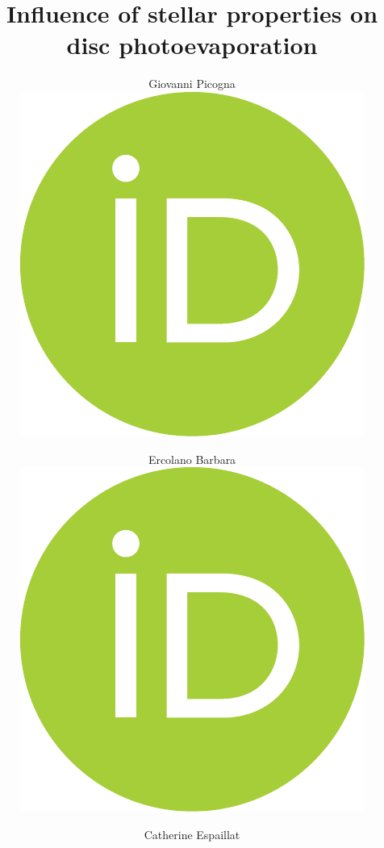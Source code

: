 \documentclass{aa}
\begin{document}
    \title{Influence of stellar properties on disc photoevaporation}

    \author{
        Giovanni Picogna  \href{https://orcid.org/0000-0003-3754-1639}{\includegraphics[scale=0.04]{orcid}} \and
        Ercolano Barbara 
        \href{https://orcid.org/0000-0001-7868-2740}{\includegraphics[scale=0.04]{orcid}}
        \and
        Catherine Espaillat 
}
\end{document}
